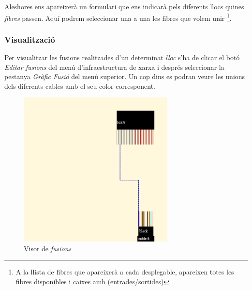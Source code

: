\documentclass[a4paper]{article}
\begin{document}
	Aleshores ens apareixerà un formulari que ens indicarà pels diferents llocs quines \emph{fibres} passen. Aquí podrem seleccionar una a una les fibres que volem unir \footnote{A la llista de fibres que apareixerà a cada desplegable, apareixen totes les fibres disponibles i caixes amb (entrades/sortides)}.
	

	\subsubsection{Visualització}
	Per visualitzar les fusions realitzades d'un determinat \emph{lloc} s'ha de clicar el botó \emph{Editar fusions} del menú d'infraestructura de xarxa i després seleccionar la pestanya \emph{Gràfic Fusió} del menú superior. Un cop dins es podran veure les unions dels diferents cables amb el seu color corresponent.
	
	\begin{figure}[H]
		\centering
		\includegraphics[width=0.7\textwidth]{images/fusions_diagram.png}
		\caption{Visor de \emph{fusions}}
	\end{figure}
\end{document}
